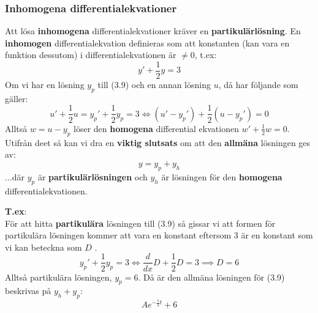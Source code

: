 \documentclass{report}
\begin{document}
\subsubsection{Inhomogena differentialekvationer}
Att lösa \textbf{inhomogena} differentialekvationer kräver en \textbf{partikulärlösning}. En \textbf{inhomogen} differentialekvation definieras som att konstanten (kan vara en funktion dessutom) i differentialekvationen är $ \ne 0 $, t.ex:
\begin{equation}
y'+ \frac{1}{2} y = 3
\end{equation}
Om vi har en lösning $ y_p $ till (3.9) och en annan lösning $ u $, då har följande som gäller:
\begin{equation*}
u' + \frac{1}{2} u = y_p'+ \frac{1}{2} y_p = 3 \iff (u'-y_p')+ \frac{1}{2} (u-y_p') = 0
\end{equation*}
Alltså $ w = u-y_p $ löser den \textbf{homogena} differential ekvationen $ w' + \frac{1}{2} w = 0 $. Utifrån deet så kan vi dra en \textbf{viktig slutsats} om att den \textbf{allmäna} lösningen ges av:
\begin{equation*}
y = y_p + y_h
\end{equation*}
...där $ y_p $ är \textbf{partikulärlösningen} och $ y_h $ är lösningen för den \textbf{homogena} differentialekvationen.


\pagebreak
\noindent
\textbf{T.ex}:\\
För att hitta \textbf{partikulära} lösningen till (3.9) så gissar vi att formen för partikulära lösningen kommer att vara en konstant eftersom $ 3 $ är en konstant som vi kan beteckna som $ D $ .
\begin{equation*}
y_p'+ \frac{1}{2} y_p = 3 \iff \frac{d}{dx}D + \frac{1}{2} D = 3 \implies D = 6
\end{equation*}
Alltså partikulära lösningen, $ y_p = 6 $. Då är den allmäna lösningen för (3.9) beskrivas på $ y_h + y_p $:
\begin{equation*}
	Ae^{- \frac{1}{2} t} + 6
\end{equation*}
\end{document}

